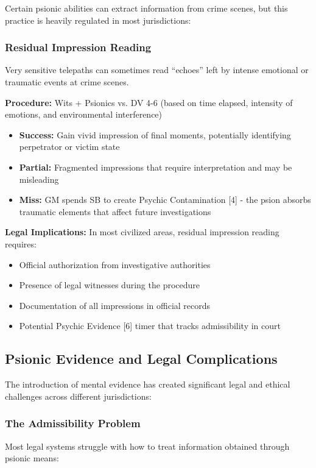 \documentclass[11pt,twoside]{article}
\begin{document}
Certain psionic abilities can extract information from crime scenes, but this practice is heavily regulated in most jurisdictions:

\subsubsection{Residual Impression Reading}
Very sensitive telepaths can sometimes read ``echoes'' left by intense emotional or traumatic events at crime scenes.

\textbf{Procedure:} Wits + Psionics vs. DV 4-6 (based on time elapsed, intensity of emotions, and environmental interference)
\begin{itemize}
    \item \textbf{Success:} Gain vivid impression of final moments, potentially identifying perpetrator or victim state
    \item \textbf{Partial:} Fragmented impressions that require interpretation and may be misleading
    \item \textbf{Miss:} GM spends SB to create Psychic Contamination [4] - the psion absorbs traumatic elements that affect future investigations
\end{itemize}

\textbf{Legal Implications:} In most civilized areas, residual impression reading requires:
\begin{itemize}
    \item Official authorization from investigative authorities
    \item Presence of legal witnesses during the procedure
    \item Documentation of all impressions in official records
    \item Potential Psychic Evidence [6] timer that tracks admissibility in court
\end{itemize}

\subsection{Psionic Evidence and Legal Complications}

The introduction of mental evidence has created significant legal and ethical challenges across different jurisdictions:

\subsubsection{The Admissibility Problem}
Most legal systems struggle with how to treat information obtained through psionic means:
\end{document}

